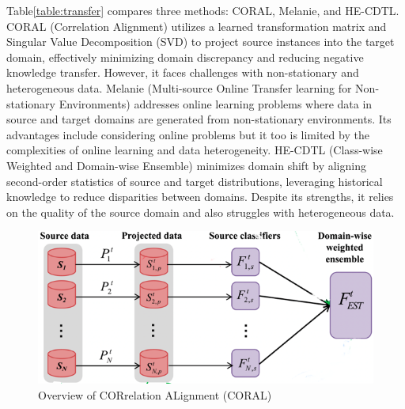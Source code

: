 Table\ref{table:transfer} compares three methods: CORAL, Melanie, and HE-CDTL. CORAL (Correlation Alignment) utilizes a learned transformation matrix and Singular Value Decomposition (SVD) to project source instances into the target domain, effectively minimizing domain discrepancy and reducing negative knowledge transfer. However, it faces challenges with non-stationary and heterogeneous data. Melanie (Multi-source Online Transfer learning for Non-stationary Environments) addresses online learning problems where data in source and target domains are generated from non-stationary environments. Its advantages include considering online problems but it too is limited by the complexities of online learning and data heterogeneity. HE-CDTL (Class-wise Weighted and Domain-wise Ensemble) minimizes domain shift by aligning second-order statistics of source and target distributions, leveraging historical knowledge to reduce disparities between domains. Despite its strengths, it relies on the quality of the source domain and also struggles with heterogeneous data.
\begin{figure}[!ht]

    \begin{center}
        \includegraphics[width=.85\textwidth]{3_State-of-the-art/fig/coral.png} 
    \end{center}
    \caption{Overview of CORrelation ALignment (CORAL)}
    \label{coral_fig}
    \end{figure}
